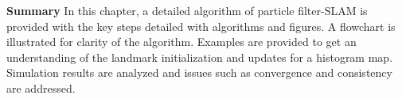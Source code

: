 \textbf{Summary}
In this chapter, a detailed algorithm of particle filter-SLAM is provided with the key steps detailed with algorithms and figures. A flowchart is illustrated for clarity of the algorithm. Examples are provided to get an understanding of the landmark initialization and updates for a histogram map. Simulation results are analyzed and issues such as convergence and consistency are addressed.